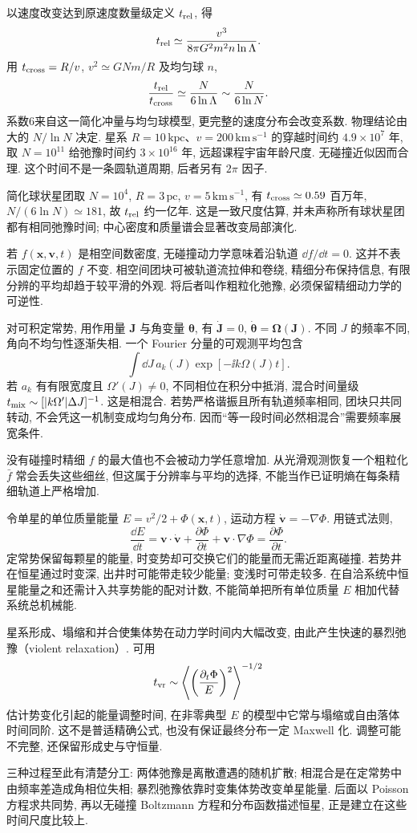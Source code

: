 以速度改变达到原速度数量级定义 $t_{\rm rel}$, 得
\[
t_{\rm rel}\simeq\frac{v^3}{8\pi G^2m^2n\ln\Lambda}.
\]
用 $t_{\rm cross}=R/v$, $v^2\simeq GNm/R$ 及均匀球 $n$,
\[
\frac{t_{\rm rel}}{t_{\rm cross}}\simeq\frac{N}{6\ln\Lambda}
\sim\frac{N}{6\ln N}.
\]
系数6来自这一简化冲量与均匀球模型, 更完整的速度分布会改变系数. 物理结论由大的 $N/\ln N$ 决定. 星系 $R=10\,\mathrm{kpc}$、$v=200\,\mathrm{km\,s^{-1}}$ 的穿越时间约 $4.9\times10^7$ 年, 取 $N=10^{11}$ 给弛豫时间约 $3\times10^{16}$ 年, 远超课程宇宙年龄尺度. 无碰撞近似因而合理. 这个时间不是一条圆轨道周期, 后者另有 $2\pi$ 因子.

\begin{example}
简化球状星团取 $N=10^4$, $R=3\,\mathrm{pc}$, $v=5\,\mathrm{km\,s^{-1}}$, 有 $t_{\rm cross}\simeq0.59$ 百万年, $N/(6\ln N)\simeq181$, 故 $t_{\rm rel}$ 约一亿年. 这是一致尺度估算, 并未声称所有球状星团都有相同弛豫时间; 中心密度和质量谱会显著改变局部演化.
\end{example}

若 $f(\boldsymbol x,\boldsymbol v,t)$ 是相空间数密度, 无碰撞动力学意味着沿轨道 $\dd f/\dd t=0$. 这并不表示固定位置的 $f$ 不变. 相空间团块可被轨道流拉伸和卷绕, 精细分布保持信息, 有限分辨的平均却趋于较平滑的外观. 将后者叫作粗粒化弛豫, 必须保留精细动力学的可逆性.

对可积定常势, 用作用量 $\boldsymbol J$ 与角变量 $\boldsymbol\theta$, 有 $\dot{\boldsymbol J}=0$, $\dot{\boldsymbol\theta}=\boldsymbol\Omega(\boldsymbol J)$. 不同 $J$ 的频率不同, 角向不均匀性逐渐失相. 一个 Fourier 分量的可观测平均包含
\[
\int\dd J\,a_k(J)\exp[-\ii k\Omega(J)t].
\]
若 $a_k$ 有有限宽度且 $\Omega'(J)\ne0$, 不同相位在积分中抵消, 混合时间量级 $t_{\rm mix}\sim[|k\Omega'|\Delta J]^{-1}$. 这是相混合. 若势严格谐振且所有轨道频率相同, 团块只共同转动, 不会凭这一机制变成均匀角分布. 因而“等一段时间必然相混合”需要频率展宽条件.

没有碰撞时精细 $f$ 的最大值也不会被动力学任意增加. 从光滑观测恢复一个粗粒化 $\bar f$ 常会丢失这些细丝, 但这属于分辨率与平均的选择, 不能当作已证明熵在每条精细轨道上严格增加.

令单星的单位质量能量 $E=v^2/2+\Phi(\boldsymbol x,t)$, 运动方程 $\dot{\boldsymbol v}=-\nabla\Phi$. 用链式法则,
\[
\frac{\dd E}{\dd t}=\boldsymbol v\cdot\dot{\boldsymbol v}
+\frac{\partial\Phi}{\partial t}+\boldsymbol v\cdot\nabla\Phi
=\frac{\partial\Phi}{\partial t}.
\]
定常势保留每颗星的能量, 时变势却可交换它们的能量而无需近距离碰撞. 若势井在恒星通过时变深, 出井时可能带走较少能量; 变浅时可带走较多. 在自洽系统中恒星能量之和还需计入共享势能的配对计数, 不能简单把所有单位质量 $E$ 相加代替系统总机械能.

星系形成、塌缩和并合使集体势在动力学时间内大幅改变, 由此产生快速的暴烈弛豫（violent relaxation）. 可用
\[
t_{\rm vr}\sim\left\langle\left(\frac{\partial_t\Phi}{E}\right)^2\right\rangle^{-1/2}
\]
估计势变化引起的能量调整时间, 在非零典型 $E$ 的模型中它常与塌缩或自由落体时间同阶. 这不是普适精确公式, 也没有保证最终分布一定 Maxwell 化. 调整可能不完整, 还保留形成史与守恒量.

三种过程至此有清楚分工: 两体弛豫是离散遭遇的随机扩散; 相混合是在定常势中由频率差造成角相位失相; 暴烈弛豫依靠时变集体势改变单星能量. 后面以 Poisson 方程求共同势, 再以无碰撞 Boltzmann 方程和分布函数描述恒星, 正是建立在这些时间尺度比较上.

